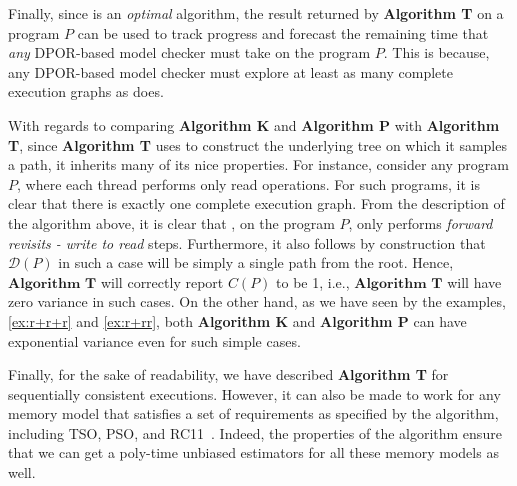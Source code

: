 Finally, since \trust is an \emph{optimal} \dpor algorithm, the result returned by \textbf{Algorithm T} on a program $P$ can be used to track progress and forecast the remaining time that \emph{any} DPOR-based model checker must take on the program $P$. This is because, any DPOR-based model checker must explore at least as many complete execution graphs as \trust does. 

With regards to comparing \textbf{Algorithm K} and \textbf{Algorithm P} with \textbf{Algorithm T}, since \textbf{Algorithm T} uses \trust to construct the underlying tree on which it samples a path, it inherits many of its nice properties. For instance, consider any program $P$, where each thread performs only read operations. 
For such programs, it is clear that there is exactly one complete execution graph. 
From the description of the \trust algorithm above, it is clear that \trust, on the program $P$, only performs \emph{forward revisits - write to read} steps. Furthermore, it also follows by construction that $\mathcal{D}(P)$ in such a case will be simply a single path from the root. Hence, $\textbf{Algorithm T}$ will correctly report $C(P)$ to be 1, i.e., $\textbf{Algorithm T}$ will have zero variance in such cases.
On the other hand, as we have seen by the examples, \ref{ex:r+r+r} and \ref{ex:r+rr}, both \textbf{Algorithm K} and \textbf{Algorithm P} can have exponential variance even for such simple cases.

Finally, for the sake of readability, we have described \textbf{Algorithm T} for sequentially consistent executions. However, it can also be made to work for any memory model that satisfies a set of requirements as specified by the \trust algorithm, including TSO, PSO, and RC11~\cite{trust}. Indeed, the properties of the \trust algorithm ensure that we can get a poly-time unbiased estimators for all these memory models as well. 







